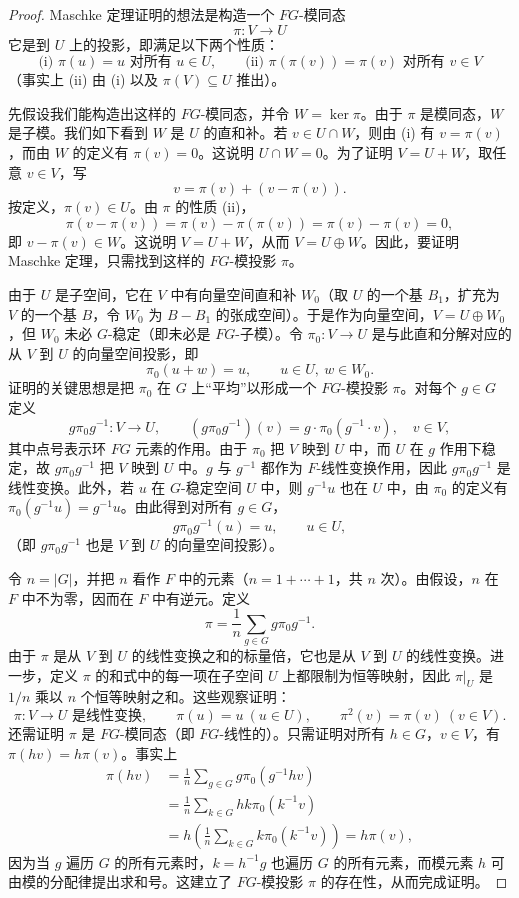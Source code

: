 \begin{proof}
Maschke 定理证明的想法是构造一个 $FG$-模同态
\[
  \pi:V\to U
\]
它是到 $U$ 上的投影，即满足以下两个性质：
\[
  \text{(i) }\pi(u)=u\text{ 对所有 }u\in U,
  \qquad
  \text{(ii) }\pi(\pi(v))=\pi(v)\text{ 对所有 }v\in V
\]
（事实上 (ii) 由 (i) 以及 $\pi(V)\subseteq U$ 推出）。

先假设我们能构造出这样的 $FG$-模同态，并令 $W=\ker\pi$。由于 $\pi$ 是模同态，$W$ 是子模。我们如下看到 $W$ 是 $U$ 的直和补。若 $v\in U\cap W$，则由 (i) 有 $v=\pi(v)$，而由 $W$ 的定义有 $\pi(v)=0$。这说明 $U\cap W=0$。为了证明 $V=U+W$，取任意 $v\in V$，写
\[
  v=\pi(v)+(v-
  \pi(v)).
\]
按定义，$\pi(v)\in U$。由 $\pi$ 的性质 (ii)，
\[
  \pi(v-\pi(v))=\pi(v)-\pi(\pi(v))=\pi(v)-\pi(v)=0,
\]
即 $v-\pi(v)\in W$。这说明 $V=U+W$，从而 $V=U\oplus W$。因此，要证明 Maschke 定理，只需找到这样的 $FG$-模投影 $\pi$。

由于 $U$ 是子空间，它在 $V$ 中有向量空间直和补 $W_0$（取 $U$ 的一个基 $B_1$，扩充为 $V$ 的一个基 $B$，令 $W_0$ 为 $B-B_1$ 的张成空间）。于是作为向量空间，$V=U\oplus W_0$，但 $W_0$ 未必 $G$-稳定（即未必是 $FG$-子模）。令 $\pi_0:V\to U$ 是与此直和分解对应的从 $V$ 到 $U$ 的向量空间投影，即
\[
  \pi_0(u+w)=u,
  \qquad u\in U,
  \ w\in W_0.
\]
证明的关键思想是把 $\pi_0$ 在 $G$ 上“平均”以形成一个 $FG$-模投影 $\pi$。对每个 $g\in G$ 定义
\[
  g\pi_0g^{-1}:V\to U,
  \qquad
  (g\pi_0g^{-1})(v)=g\cdot\pi_0(g^{-1}\cdot v),
  \quad v\in V,
\]
其中点号表示环 $FG$ 元素的作用。由于 $\pi_0$ 把 $V$ 映到 $U$ 中，而 $U$ 在 $g$ 作用下稳定，故 $g\pi_0g^{-1}$ 把 $V$ 映到 $U$ 中。$g$ 与 $g^{-1}$ 都作为 $F$-线性变换作用，因此 $g\pi_0g^{-1}$ 是线性变换。此外，若 $u$ 在 $G$-稳定空间 $U$ 中，则 $g^{-1}u$ 也在 $U$ 中，由 $\pi_0$ 的定义有 $\pi_0(g^{-1}u)=g^{-1}u$。由此得到对所有 $g\in G$，
\[
  g\pi_0g^{-1}(u)=u,
  \qquad u\in U,
\]
（即 $g\pi_0g^{-1}$ 也是 $V$ 到 $U$ 的向量空间投影）。

令 $n=|G|$，并把 $n$ 看作 $F$ 中的元素（$n=1+\cdots+1$，共 $n$ 次）。由假设，$n$ 在 $F$ 中不为零，因而在 $F$ 中有逆元。定义
\[
  \pi=\frac1n\sum_{g\in G}g\pi_0g^{-1}.
\]
由于 $\pi$ 是从 $V$ 到 $U$ 的线性变换之和的标量倍，它也是从 $V$ 到 $U$ 的线性变换。进一步，定义 $\pi$ 的和式中的每一项在子空间 $U$ 上都限制为恒等映射，因此 $\pi|_U$ 是 $1/n$ 乘以 $n$ 个恒等映射之和。这些观察证明：
\[
  \pi:V\to U\text{ 是线性变换},
  \qquad \pi(u)=u\ (u\in U),
  \qquad \pi^2(v)=\pi(v)\ (v\in V).
\]
还需证明 $\pi$ 是 $FG$-模同态（即 $FG$-线性的）。只需证明对所有 $h\in G$，$v\in V$，有 $\pi(hv)=h\pi(v)$。事实上
\[
\begin{aligned}
  \pi(hv)
  &=\frac1n\sum_{g\in G}g\pi_0(g^{-1}hv)\\
  &=\frac1n\sum_{k\in G}hk\pi_0(k^{-1}v)\\
  &=h\left(\frac1n\sum_{k\in G}k\pi_0(k^{-1}v)\right)
  =h\pi(v),
\end{aligned}
\]
因为当 $g$ 遍历 $G$ 的所有元素时，$k=h^{-1}g$ 也遍历 $G$ 的所有元素，而模元素 $h$ 可由模的分配律提出求和号。这建立了 $FG$-模投影 $\pi$ 的存在性，从而完成证明。
\end{proof}

